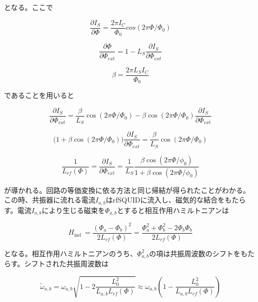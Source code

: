 となる。ここで

\begin{equation}
    \frac{\partial I_S}{\partial \Phi} = \frac{2\pi I_C}{\Phi_0} cos (2 \pi \Phi / \Phi_0)
\end{equation}

\begin{equation}
    \frac{\partial \Phi}{\partial \Phi_{ext}} = 1 - L_S\frac{\partial I_S}{\partial \Phi_{ext}}
\end{equation}

\begin{equation}
    \beta = \frac{2\pi L_S I_C}{\Phi_0}
\end{equation}

であることを用いると

\begin{equation*}
    \frac{\partial I_S}{\partial \Phi_{ext}} = \frac{\beta}{L_S}\cos (2\pi \Phi/\Phi_0)-\beta \cos (2\pi \Phi / \Phi_0) \frac{\partial I_S}{\partial \Phi_{ext}}
\end{equation*}

\begin{equation*}
    \biggl(1+\beta \cos (2\pi \Phi / \Phi_0)\biggr)\frac{\partial I_S}{\partial \Phi_{ext}} = \frac{\beta}{L_S}\cos (2\pi \Phi / \Phi_0)
\end{equation*}

\begin{equation*}
    \frac{1}{L_{rf}(\Phi)}=\frac{\partial I_S}{\partial \Phi_{ext}} = \frac{1}{L_{S}} \frac{\beta \cos \left(2 \pi \Phi/\phi_{0}\right)}{1+\beta \cos \left(2 \pi \Phi/\phi_{0}\right)}
\end{equation*}

が導かれる。回路の等価変換に依る方法と同じ帰結が得られたことがわかる。\\
この時、共振器に流れる電流$I_{a,b}$はrfSQUIDに流入し、磁気的な結合をもたらす。電流$I_{a,b}$により生じる磁束を$\Phi_{a,b}$とすると相互作用ハミルトニアンは

\begin{equation}
    H_{\text {ind }}=\frac{\left(\Phi_{a}-\Phi_{b}\right)^{2}}{2 L_{rf}(\Phi)}=\frac{\Phi_{a}^{2}+\Phi_{b}^{2}-2 \Phi_{b} \Phi_{b}}{2 L_{rf}(\Phi)}
\end{equation}

となる。相互作用ハミルトニアンのうち、$\Phi_{a,b}^2$の項は共振周波数のシフトをもたらす。シフトされた共振周波数は

\begin{equation}
    \tilde{\omega}_{a,b}=\omega_{a,b} \sqrt{1-2 \frac{L_{0}^{2}}{L_{a,b} L_{rf}(\Phi)}} \approx \omega_{a,b}\left(1-\frac{L_{0}^{2}}{L_{a,b} L_{rf}(\Phi)}\right)
\end{equation}

